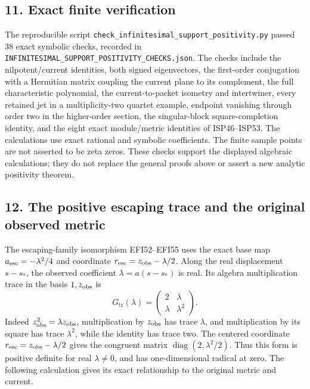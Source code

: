 \documentclass[
  10pt,
  a4paper,
]{article}
\begin{document}
\subsection{11. Exact finite
verification}\label{exact-finite-verification}

The reproducible script
\texttt{check\_\allowbreak{}infinitesimal\_\allowbreak{}support\_\allowbreak{}positivity.\allowbreak{}py} passed 38 exact
symbolic checks, recorded in
\texttt{INFINITESIMAL\_\allowbreak{}SUPPORT\_\allowbreak{}POSITIVITY\_\allowbreak{}CHECKS.\allowbreak{}json}. The checks
include the nilpotent/current identities, both signed eigenvectors, the
first-order conjugation with a Hermitian matrix coupling the current
plane to its complement, the full characteristic polynomial, the
current-to-packet isometry and intertwiner, every retained jet in a
multiplicity-two quartet example, endpoint vanishing through order two
in the higher-order section, the singular-block square-completion
identity, and the eight exact module/metric identities of ISP46--ISP53.
The calculations use exact rational and symbolic coefficients. The
finite sample points are not asserted to be zeta zeros. These checks
support the displayed algebraic calculations; they do not replace the
general proofs above or assert a new analytic positivity theorem.

\subsection{12. The positive escaping trace and the original observed
metric}\label{the-positive-escaping-trace-and-the-original-observed-metric}

The escaping-family isomorphism EFI52--EFI55 uses the exact base map
\(a_{\rm esc}=-\lambda^2/4\) and coordinate
\(r_{\rm esc}=z_{\rm obs}-\lambda/2\). Along the real displacement
\(s-s_*\), the observed coefficient \(\lambda=a(s-s_*)\) is real. Its
algebra multiplication trace in the basis \(1,z_{\rm obs}\) is \[
G_{\mathrm{tr}}(\lambda)=\begin{pmatrix}2&\lambda\\\lambda&\lambda^2\end{pmatrix}.
\tag{ISP45}
\] Indeed \(z_{\rm obs}^2=\lambda z_{\rm obs}\), multiplication by
\(z_{\rm obs}\) has trace \(\lambda\), and multiplication by its square
has trace \(\lambda^2\), while the identity has trace two. The centered
coordinate \(r_{\rm esc}=z_{\rm obs}-\lambda/2\) gives the congruent
matrix \(\operatorname{diag}(2,\lambda^2/2)\). Thus this form is
positive definite for real \(\lambda\ne0\), and has one-dimensional
radical at zero. The following calculation gives its exact relationship
to the original metric and current.
\end{document}
